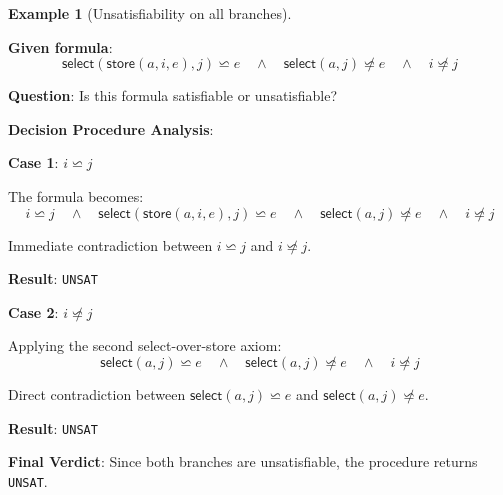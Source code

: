\documentclass[11pt,a4paper]{article}
\theoremstyle{definition}
\newtheorem{example}{Example}[section]
\theoremstyle{plain}
\theoremstyle{remark}
\begin{document}
\begin{example}[Unsatisfiability on all branches]
\begin{tcolorbox}[colback=red!5!white,colframe=red!75!black,title=\textbf{Example 3: UNSAT on All Branches},breakable]
\textbf{Given formula}:
\[
\textsf{select}(\textsf{store}(a, i, e), j) \backsimeq e \quad \wedge \quad \textsf{select}(a, j) \not\backsimeq e \quad \wedge \quad i \not\backsimeq j
\]

\textbf{Question}: Is this formula satisfiable or unsatisfiable?

\vspace{0.5em}

\textbf{Decision Procedure Analysis}:

\textbf{Case 1}: $i \backsimeq j$

The formula becomes:
\[
i \backsimeq j \quad \wedge \quad \textsf{select}(\textsf{store}(a, i, e), j) \backsimeq e \quad \wedge \quad \textsf{select}(a, j) \not\backsimeq e \quad \wedge \quad i \not\backsimeq j
\]

Immediate contradiction between $i \backsimeq j$ and $i \not\backsimeq j$.

\textbf{Result}: \texttt{UNSAT}

\vspace{0.3em}

\textbf{Case 2}: $i \not\backsimeq j$

Applying the second select-over-store axiom:
\[
\textsf{select}(a, j) \backsimeq e \quad \wedge \quad \textsf{select}(a, j) \not\backsimeq e \quad \wedge \quad i \not\backsimeq j
\]

Direct contradiction between $\textsf{select}(a, j) \backsimeq e$ and $\textsf{select}(a, j) \not\backsimeq e$.

\textbf{Result}: \texttt{UNSAT}

\vspace{0.5em}

\textbf{Final Verdict}: Since both branches are unsatisfiable, the procedure returns \texttt{UNSAT}.
\end{tcolorbox}
\end{example}

\newpage
\end{document}

